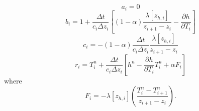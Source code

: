 \documentclass[12pt,authoryear]{elsarticle}
\numberwithin{equation}{section} %
\begin{document}
\begin{equation}
a_{i}=0
\end{equation}
\begin{equation}
b_{i}=1+\frac{\Delta t}{c_{i}\Delta z_{i}}\left[(1-\alpha)\frac{\lambda[z_{h,i}]}{z_{i+1}-z_{i}}-\frac{\partial h}{\partial T_{i}}\right]
\end{equation}
\begin{equation}
c_{i}=-(1-\alpha)\frac{\Delta t}{c_{i}\Delta z_{i}}\frac{\lambda[z_{h,i}]}{z_{i+1}-z_{i}}
\end{equation}
\begin{equation}
\label{eq:tridiagonal_system_heat_flux}
r_{i}=T_{i}^{n}+\frac{\Delta t}{c_{i}\Delta z_{i}}\left[h^{n}-\frac{\partial h}{\partial T_{i}}T_{i}^{n}+\alpha F_{i}\right]
\end{equation}
where
\begin{equation}
\label{eq:flux_i}
F_{i}=-\lambda[z_{h,i}]\left(\frac{T_{i}^{n}-T_{i+1}^{n}}{z_{i+1}-z_{i}}\right).
\end{equation}
\end{document}
